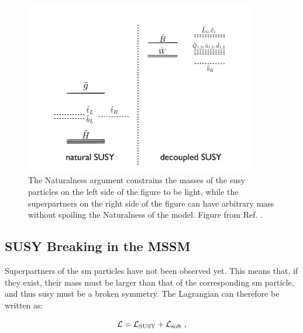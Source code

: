 \begin{figure}[h!]
\begin{center} 
\includegraphics[width=0.9\textwidth]{figures/theory/NaturalSpec.pdf} 
\end{center}
\caption{The Naturalness argument constrains the masses of the \gls{susy} particles on the left side of the figure to be light, while the superpartners on the right side of the figure can have arbitrary mass without spoiling the Naturalness of the model. Figure from Ref. \cite{Papucci:2011wy}.}
\label{fig:NaturalSpectrum}
\end{figure}


\subsection{SUSY Breaking in the MSSM}

Superpartners of the \gls{sm} particles have not been observed yet. This means that, if they exist, their mass must be larger than that of the corresponding \gls{sm} particle, and thus \gls{susy} must be a broken symmetry. The Lagrangian can therefore be written as:

\begin{equation}
\mathcal{L} = \mathcal{L}_{\rm SUSY} + \mathcal{L}_{\rm soft} \; ,
\end{equation}

